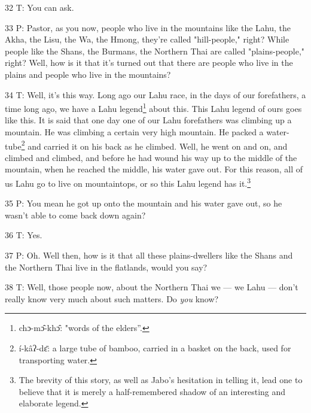 32 T: You can ask.

33 P: Pastor, as you now, people who live in the mountains like the Lahu, the Akha,
the Lisu, the Wa, the Hmong, they're called "hill-people," right?
While people like the Shans, the Burmans, the Northern Thai are called "plains-people,"
right? Well, how is it that it's turned out that there are people who live in the
plains and people who live in the mountains?

34 T: Well, it's this way. Long ago our Lahu race, in the days of our forefathers,
a time long ago, we have a Lahu legend\footnote{chɔ-mɔ̂-khɔ̂: "words of the elders''.} about this. This Lahu legend of ours
goes like this. It is said that one day one of our Lahu forefathers was climbing
up a mountain. He was climbing a certain very high mountain. He packed a water-tube\footnote{í-kâʔ-dɛ̄: a large tube of bamboo, carried in a basket on the back, used for transporting water.}
and carried it on his back as he climbed. Well, he went on and on, and climbed
and climbed, and before he had wound his way up to the middle of the mountain,
when he reached the middle, his water gave out. For this reason, all of us Lahu
go to live on mountaintops, or so this Lahu legend has it.\footnote{The brevity of this story, as well as Jabo's hesitation in telling it, lead one to believe that it is merely a half-remembered shadow of an interesting and elaborate legend.}

35 P: You mean he got up onto the mountain and his water gave out, so he wasn't
able to come back down again?

36 T: Yes.

37 P: Oh. Well then, how is it that all these plains-dwellers like the Shans and
the Northern Thai live in the flatlands, would you say?

38 T: Well, those people now, about the Northern Thai we --- we Lahu --- don't
really know very much about such matters. Do \textit{you} know?

